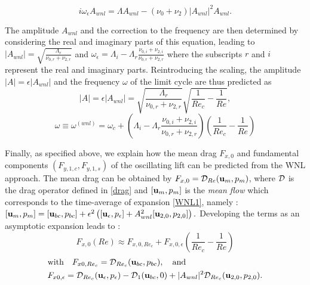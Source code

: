 \documentclass[twocolumn,10pt]{asme2ej}
\newcommand{\be}[1]{ \begin{equation} \label{#1}}
\newcommand{\ee}{\end{equation}}
\begin{document}
\be{WNL3}
i \omega_\epsilon A_{wnl} = \Lambda A_{wnl} - (\nu_0+\nu_2)  |A_{wnl}|^2 A_{wnl}.
\ee


The amplitude $A_{wnl}$ and the correction to the frequency are then determined by considering the real and imaginary parts of this equation, leading to
$
|A_{wnl}|= \sqrt{ \frac{\Lambda_r}{\nu_{0,r}+\nu_{2,r}}}
$ and
$
\omega_\epsilon = \Lambda_i- \Lambda_r \frac{\nu_{0,i}+\nu_{2,i}}{\nu_{0,r}+\nu_{2,r}} 
$
where the subscripts $r$ and $i$ represent the real and imaginary parts.
Reintroducing the scaling, the  amplitude $|A| =  \epsilon |A_{wnl}| $ and the frequency $\omega$ of the limit cycle are thus predicted as
\be{ANL} 
|A| =  \epsilon |A_{wnl}| =\sqrt{ \frac{\Lambda_r}{\nu_{0,r}+\nu_{2,r} }} \sqrt{\frac{1}{Re_c}-\frac{1}{Re}},
\ee
\be{omegaWNL} 
\omega \equiv \omega^{(wnl)} =\omega_c+ \left( \Lambda_i- \Lambda_r \frac{\nu_{0,i}+\nu_{2,i}}{\nu_{0,r}+\nu_{2,r}} \right) \left(\frac{1}{Re_c}-\frac{1}{Re}\right)
\ee 


Finally, as specified above, we explain how the mean drag $F_{x,0}$ and fundamental components $(F_{y,1,c},F_{y,1,s})$ of the oscillating lift can be predicted from the WNL approach.
The mean drag  can be obtained by $F_{x,0} = {\cal D}_{Re}({\bf u}_m,p_m)$, where ${\cal D}$ is the drag operator defined in \ref{drag} and 
$[{\bf u}_m,p_m]$ is the {\em mean flow}  
which corresponds to the time-average of expansion  \ref{WNL1}, namely :
$
[{\bf u}_m,p_m] = [{\bf u}_{bc},p_{bc}] +\epsilon^2 \left( [{\bf u}_\epsilon,p_\epsilon] + A_{wnl}^2 [{\bf u}_{2,0}, p_{2,0} ] \right).
$
Developing the terms as an asymptotic expansion leads to :
\be{drag_cos}
 F_{x,0}(Re) \approx F_{x,0,{Re_c}} +  F_{x,0,\epsilon} \left(\frac{1}{Re_c}-\frac{1}{Re}\right)
\ee 
\begin{equation*}
\begin{aligned}
& \mbox{with} \quad F_{x0,{Re_c}}  = {\cal D}_{Re_c} ({\bf u}_{bc},p_{bc}), \quad \mbox{and}  
\\ 
& F_{x0,\epsilon} = {\cal D}_{Re_c} ({\bf u}_\epsilon, p_\epsilon ) - {\cal D}_{1} ({\bf u}_{bc},0) 
+ | A_{wnl} |^2 {\cal D}_{Re_c} ({\bf u}_{2,0},p_{2,0}). 
\end{aligned}
\end{equation*}
\end{document}
